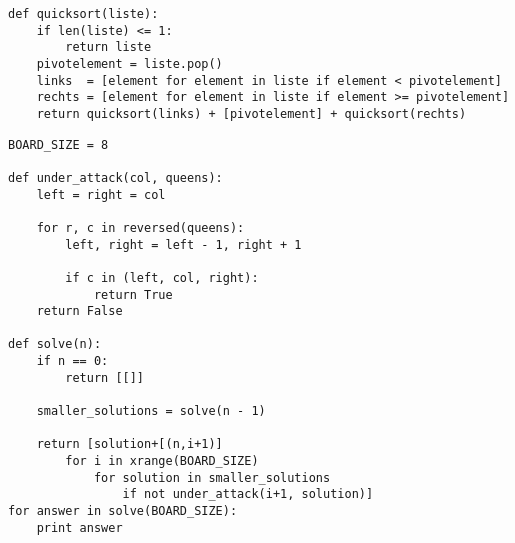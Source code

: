 \documentclass{article}
\begin{document}
\begin{lstlisting}[tabsize=2] % Python
def quicksort(liste):
    if len(liste) <= 1:
        return liste
    pivotelement = liste.pop()
    links  = [element for element in liste if element < pivotelement]
    rechts = [element for element in liste if element >= pivotelement]
    return quicksort(links) + [pivotelement] + quicksort(rechts)
\end{lstlisting}


\begin{lstlisting}[tabsize=2] % Python
BOARD_SIZE = 8

def under_attack(col, queens):
    left = right = col

    for r, c in reversed(queens):
        left, right = left - 1, right + 1

        if c in (left, col, right):
            return True
    return False

def solve(n):
    if n == 0:
        return [[]]

    smaller_solutions = solve(n - 1)

    return [solution+[(n,i+1)]
        for i in xrange(BOARD_SIZE)
            for solution in smaller_solutions
                if not under_attack(i+1, solution)]
for answer in solve(BOARD_SIZE):
    print answer
\end{lstlisting}
\end{document}
